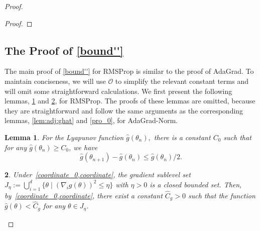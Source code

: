 \documentclass[standalone]{article}
\newtheorem{lem}{Lemma}[section]
\DeclareMathOperator{\Expect}{\mathbb{E}}
\newtheorem{assumpt}{Assumption}[section]
\newtheorem{property}[lem]{\text{Property}}
\begin{document}
\begin{proof}
\begin{proof}
\end{proof}

\subsection{The Proof of \cref{bound''}}\label{stability:proof:rmsprop}
The main proof of \cref{bound''} for RMSProp is similar to the proof of AdaGrad. To maintain conciseness, we will use \(\mathcal{O}\) to simplify the relevant constant terms and will omit some straightforward calculations. We first present the following lemmas, \cref{lem:adj:ghat''} and \cref{dsad}, for RMSProp. The proofs of these lemmas are omitted, because they are straightforward and follow the same arguments as the corresponding lemmas, \cref{lem:adj:ghat} and \cref{pro_0}, for AdaGrad-Norm.
\begin{lem}\label{lem:adj:ghat''}
For the Lyapunov function $\hat{g}(\theta_n),$ there is a constant $C_0$ such that for any $\hat{g}(\theta_{n}) \geq C_0$, we have
$$\hat{g}(\theta_{n+1})-\hat{g}(\theta_{n})\leq \hat{g}(\theta_{n})/2.
$$ 
\end{lem}
\begin{property}\label{dsad}
Under~\cref{coordinate_0,coordinate}, the gradient sublevel set $J_{\eta}:=\bigcup_{i=1}^{d}\{\theta \mid (\nabla_{i} g(\theta))^{2}\le \eta\}$ with $\eta >0$ is a closed bounded set. Then, by~\cref{coordinate_0,coordinate}, there exist a constant $\hat{C}_{g} > 0$  such that the function  $\hat{g}(\theta) < \hat{C}_{g}$ for any $\theta \in J_{\eta}$. 
\end{property}



\end{proof}
\end{document}

